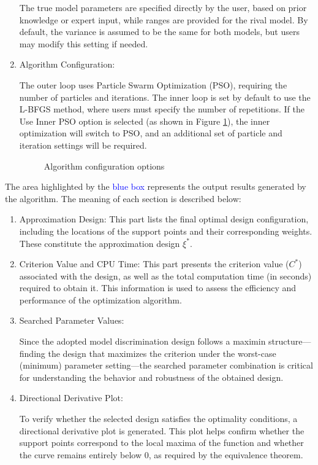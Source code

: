 \begin{enumerate}
The true model parameters are specified directly by the user, based on prior knowledge or expert input, while ranges are provided for the rival model. By default, the variance is assumed to be the same for both models, but users may modify this setting if needed.

\item Algorithm Configuration: 

The outer loop uses Particle Swarm Optimization (PSO), requiring the number of particles and iterations. The inner loop is set by default to use the L-BFGS method, where users must specify the number of repetitions. If the Use Inner PSO option is selected (as shown in Figure \ref{fig:Fidalgo-shiny5}), the inner optimization will switch to PSO, and an additional set of particle and iteration settings will be required.

\begin{figure}[H]
    \caption{Algorithm configuration options}
    \label{fig:Fidalgo-shiny5}
\end{figure}

\end{enumerate}

\hspace*{8mm} The area highlighted by the \textcolor{blue}{blue box} represents the output results generated by the algorithm. The meaning of each section is described below:

\begin{enumerate}
\item Approximation Design: This part lists the final optimal design configuration, including the locations of the support points and their corresponding weights. These constitute the approximation design $\xi^*$.

\item Criterion Value and CPU Time: This part presents the criterion value ($C^*$) associated with the design, as well as the total computation time (in seconds) required to obtain it. This information is used to assess the efficiency and performance of the optimization algorithm.

\item Searched Parameter Values: 

Since the adopted model discrimination design follows a maximin structure—finding the design that maximizes the criterion under the worst-case (minimum) parameter setting—the searched parameter combination is critical for understanding the behavior and robustness of the obtained design.

\item Directional Derivative Plot: 

To verify whether the selected design satisfies the optimality conditions, a directional derivative plot is generated. This plot helps confirm whether the support points correspond to the local maxima of the function and whether the curve remains entirely below 0, as required by the equivalence theorem.

\end{enumerate}

